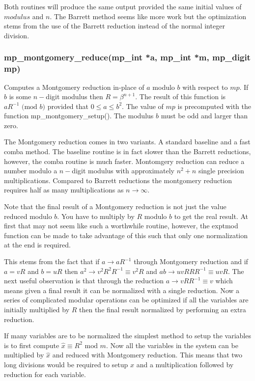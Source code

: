 \documentclass[]{article}
\begin{document}
Both routines will produce the same output provided the same initial values of $modulus$ and $n$.  The Barrett
method seems like more work but the optimization stems from the use of the Barrett reduction instead of the normal
integer division.

\subsubsection{mp\_montgomery\_reduce(mp\_int *a, mp\_int *m, mp\_digit mp)}
Computes a Montgomery reduction in-place of $a$ modulo $b$ with respect to $mp$.  If $b$ is some $n-$digit modulus then
$R = \beta^{n+1}$.  The result of this function is $aR^{-1} \mbox{ (mod }b\mbox{)}$ provided that $0 \le a \le b^2$.
The value of $mp$ is precomputed with the function mp\_montgomery\_setup().  The modulus $b$ must be odd and larger
than zero.  

The Montgomery reduction comes in two variants.  A standard baseline and a fast comba method.  The baseline routine
is in fact slower than the Barrett reductions, however, the comba routine is much faster.  Montomgery reduction can 
reduce a number modulo a $n-$digit modulus with approximately $n^2 + n$ single precision multiplications.  Compared
to Barrett reductions the montgomery reduction requires half as many multiplications as $n \rightarrow \infty$.  

Note that the final result of a Montgomery reduction is not just the value reduced modulo $b$.  You have to multiply
by $R$ modulo $b$ to get the real result.  At first that may not seem like such a worthwhile routine, however, the
exptmod function can be made to take advantage of this such that only one normalization at the end is required.

This stems from the fact that if $a \rightarrow aR^{-1}$ through Montgomery reduction and if $a = vR$ and $b = uR$ then
$a^2 \rightarrow v^2R^2R^{-1} \equiv v^2R$ and $ab \rightarrow uvRRR^{-1} \equiv uvR$.  The next useful observation is 
that through the reduction $a \rightarrow vRR^{-1} \equiv v$ which means given a final result it can be normalized with
a single reduction.  Now a series of complicated modular operations can be optimized if all the variables are initially
multiplied by $R$ then the final result normalized by performing an extra reduction.

If many variables are to be normalized the simplest method to setup the variables is to first compute $\hat x \equiv R^2 \mbox{ mod }m$.
Now all the variables in the system can be multiplied by $\hat x$ and reduced with Montgomery reduction.  This means that
two long divisions would be required to setup $\hat x$ and a multiplication followed by reduction for each variable.  
\end{document}
